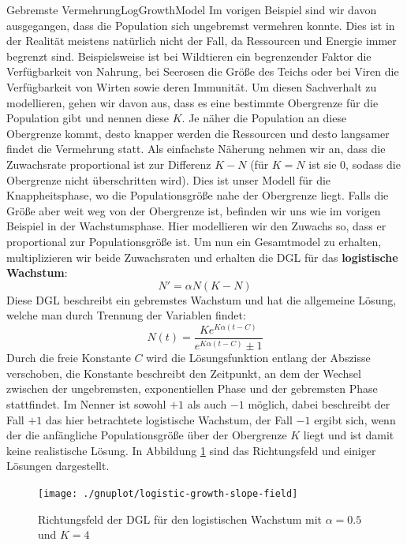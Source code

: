 \begin{example}{Gebremste Vermehrung}{LogGrowthModel}
    Im vorigen Beispiel sind wir davon ausgegangen, dass die Population sich ungebremst vermehren konnte. Dies ist in der Realität meistens natürlich nicht der Fall, da Ressourcen und Energie immer begrenzt sind. Beispielsweise ist bei Wildtieren ein begrenzender Faktor die Verfügbarkeit von Nahrung, bei Seerosen die Größe des Teichs oder bei Viren die Verfügbarkeit von Wirten sowie deren Immunität. Um diesen Sachverhalt zu modellieren, gehen wir davon aus, dass es eine bestimmte Obergrenze für die Population gibt und nennen diese $K$. Je näher die Population an diese Obergrenze kommt, desto knapper werden die Ressourcen und desto langsamer findet die Vermehrung statt. Als einfachste Näherung nehmen wir an, dass die Zuwachsrate proportional ist zur Differenz $K-N$ (für $K=N$ ist sie $0$, sodass die Obergrenze nicht überschritten wird). Dies ist unser Modell für die Knappheitsphase, wo die Populationsgröße nahe der Obergrenze liegt. Falls die Größe aber weit weg von der Obergrenze ist, befinden wir uns wie im vorigen Beispiel in der Wachstumsphase. Hier modellieren wir den Zuwachs so, dass er proportional zur Populationsgröße ist. Um nun ein Gesamtmodel zu erhalten, multiplizieren wir beide Zuwachsraten und erhalten die DGL für das \textbf{logistische Wachstum}:
    $$
        N' = \alpha N (K-N)
    $$
    Diese DGL beschreibt ein gebremstes Wachstum und hat die allgemeine Lösung, welche man durch Trennung der Variablen findet:
    $$
        N(t) = \frac{Ke^{K \alpha (t - C)}}{e^{K \alpha (t  - C)} \pm 1}
    $$
    Durch die freie Konstante $C$ wird die Lösungsfunktion entlang der Abszisse verschoben, die Konstante beschreibt den Zeitpunkt, an dem der Wechsel zwischen der ungebremsten, exponentiellen Phase und der gebremsten Phase stattfindet. Im Nenner ist sowohl $+1$ als auch $-1$ möglich, dabei beschreibt der Fall $+1$ das hier betrachtete logistische Wachstum, der Fall $-1$ ergibt sich, wenn der die anfängliche Populationsgröße über der Obergrenze $K$ liegt und ist damit keine realistische Lösung. In Abbildung \ref{fig:ExSlopeFieldLogGrowth} sind das Richtungsfeld und einiger Lösungen dargestellt.
\end{example}

\begin{figure}
    \centering
    \texttt{[image: ./gnuplot/logistic-growth-slope-field]}
    \caption[Richtungsfeld der logistischen DGL]{Richtungsfeld der DGL für den logistischen Wachstum mit $\alpha=0.5$ und $K=4$}
    \label{fig:ExSlopeFieldLogGrowth}
\end{figure}

